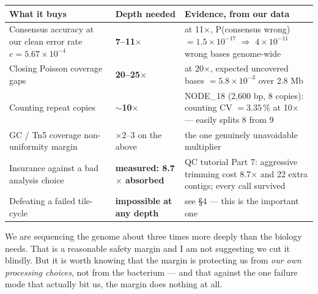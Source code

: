 \begin{center}\small
\begin{tabular}{@{}>{\raggedright\arraybackslash}p{6.0cm}>{\raggedright\arraybackslash}p{3.0cm}>{\raggedright\arraybackslash}p{7.4cm}@{}}
\toprule
\rowcolor{nano!13}
\textbf{\color{nano}What it buys} & \textbf{\color{nano}Depth needed} & \textbf{\color{nano}Evidence, from our data}\\
\midrule
Consensus accuracy at our clean error rate $e=5.67\times10^{-4}$ & \textbf{7--11$\times$} &
 at 11$\times$, P(consensus wrong) $=1.5\times10^{-17}$ $\Rightarrow$ $4\times10^{-11}$ wrong bases genome-wide\\
Closing Poisson coverage gaps & \textbf{20--25$\times$} &
 at 20$\times$, expected uncovered bases $=5.8\times10^{-3}$ over 2.8 Mb\\
Counting repeat copies & \textbf{$\sim$10$\times$} &
 NODE\_18 (2{,}600 bp, 8 copies): counting CV $=3.35\,\%$ at 10$\times$ --- easily splits 8 from 9\\
GC / Tn5 coverage non-uniformity margin & $\times$2--3 on the above & the one genuinely unavoidable multiplier\\
\rowcolor{alert!7}
Insurance against a bad analysis choice & \textbf{measured: 8.7$\times$ absorbed} &
 QC tutorial Part 7: aggressive trimming cost 8.7$\times$ and 22 extra contigs; every call survived\\
\rowcolor{alert!12}
Defeating a failed tile-cycle & \textbf{impossible at any depth} & see \S4 --- this is the important one\\
\bottomrule
\end{tabular}
\end{center}

\begin{plain}
We are sequencing the genome about three times more deeply than the biology needs. That is a
reasonable safety margin and I am not suggesting we cut it blindly. But it is worth knowing that the
margin is protecting us from \emph{our own processing choices}, not from the bacterium --- and that
against the one failure mode that actually bit us, the margin does nothing at all.
\end{plain}
